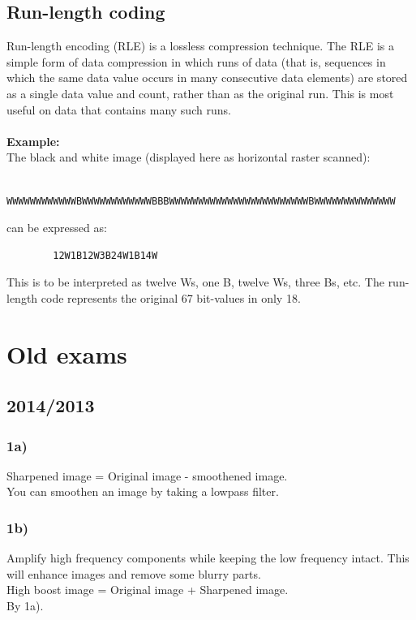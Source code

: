 \documentclass[12pt]{article}
\begin{document}
    \subsection{Run-length coding}
    Run-length encoding (RLE) is a lossless compression technique. The RLE is a simple form of data compression in which runs of data (that
    is, sequences in which the same data value occurs in many consecutive data elements) are stored
    as a single data value and count, rather than as the original run. This is most useful on data 
    that contains many such runs. \\
    \\
    \textbf{Example:}\\
    The black and white image (displayed here as horizontal raster scanned):
    \begin{verbatim}
        WWWWWWWWWWWWBWWWWWWWWWWWWBBBWWWWWWWWWWWWWWWWWWWWWWWWBWWWWWWWWWWWWWW
    \end{verbatim}
    can be expressed as:
    \begin{verbatim}
        12W1B12W3B24W1B14W
    \end{verbatim}
        This is to be interpreted as twelve Ws, one B, twelve Ws, three Bs, etc.
        The run-length code represents the original 67 bit-values in only 18.    
%	
%	
\section{Old exams}
	\subsection{2014/2013}
	\subsubsection*{1a)}
	
	    Sharpened image = Original image - smoothened image.\\
	    You can smoothen an image by taking a lowpass filter. 
	
	\subsubsection*{1b)}
	
	    Amplify high frequency components while keeping the low frequency intact. This will enhance images and remove some blurry parts. \\
	    High boost image = Original image + Sharpened image. 
	    \\By 1a).
	
\end{document}
